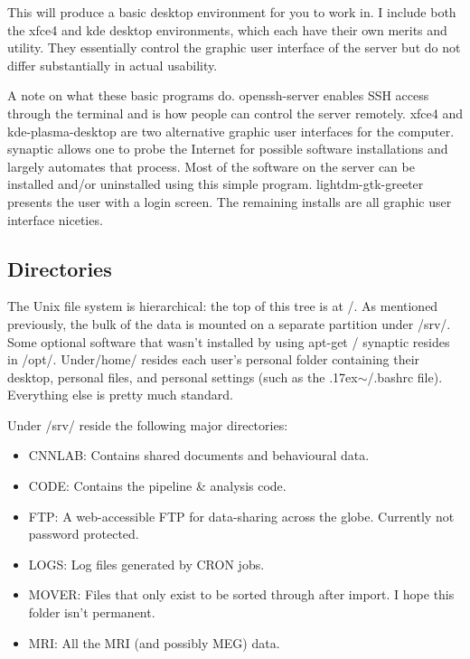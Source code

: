 \documentclass[final,titlepage,letterpaper,oneside,12pt]{article}
\renewcommand{\texttt}[2][BrickRed]{\textcolor{#1}{\ttfamily #2}}%
\newcommand{\atilde}{\raise.17ex\hbox{$\scriptstyle\mathtt{\sim}$}}
\begin{document}
This will produce a basic desktop environment for you to work in. I include both the \texttt{xfce4} and \texttt{kde} desktop environments, which each have their own merits and utility. They essentially control the graphic user interface of the server but do not differ substantially in actual usability.

A note on what these basic programs do. \texttt{openssh-server} enables SSH access through the terminal and is how people can control the server remotely. \texttt{xfce4} and \texttt{kde-plasma-desktop} are two alternative graphic user interfaces for the computer. \texttt{synaptic} allows one to probe the Internet for possible software installations and largely automates that process. Most of the software on the server can be installed and/or uninstalled using this simple program. \texttt{lightdm-gtk-greeter} presents the user with a login screen. The remaining installs are all graphic user interface niceties.

\subsection{Directories}

The Unix file system is hierarchical: the top of this tree is at \texttt{/}. As mentioned previously, the bulk of the data is mounted on a separate partition under \texttt{/srv/}. Some optional software that wasn't installed by using \texttt{apt-get} / \texttt{synaptic} resides in \texttt{/opt/}. Under\texttt{/home/} resides each user's personal folder containing their desktop, personal files, and personal settings (such as the \texttt{\atilde/.bashrc} file). Everything else is pretty much standard.

Under \texttt{/srv/} reside the following major directories:
\begin{itemize} \itemsep-2pt
    \item{CNNLAB: Contains shared documents and behavioural data.}
    \item{CODE: Contains the pipeline \& analysis code.}
    \item{FTP: A web-accessible FTP for data-sharing across the globe. Currently not password protected.}
    \item{LOGS: Log files generated by \texttt{CRON} jobs.}
    \item{MOVER: Files that only exist to be sorted through after import. I hope this folder isn't permanent.}
    \item{MRI: All the MRI (and possibly MEG) data.}
\end{itemize}
\end{document}
